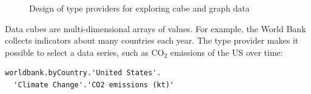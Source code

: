 \documentclass[fleqn,11pt]{report}
\theoremstyle{definition}
\begin{document}
\begin{figure}[t]
\quad
{}
\vspace{0.5em}
\caption{Design of type providers for exploring cube and graph data}
\label{fig:tpdiags}
\end{figure}

Data cubes are multi-dimensional arrays of values. For example, the World Bank collects
indicators about many countries each year. The type provider makes it possible to select a data
series, such as CO$_2$ emissions of the US over time:

\begin{lstlisting}[language=thegamma]
worldbank.byCountry.'United States'.
  'Climate Change'.'CO2 emissions (kt)'
\end{lstlisting}
\end{document}
